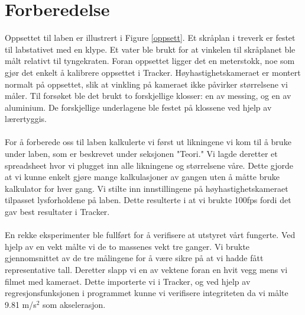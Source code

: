 \documentclass[10pt,a4paper]{report}
\begin{document}
\section*{Forberedelse}
Oppsettet til laben er illustrert i Figure \ref{oppsett}. Et skråplan i treverk er festet til labstativet med en klype. Et vater ble brukt for at vinkelen til skråplanet ble målt relativt til tyngekraten. Foran oppsettet ligger det en meterstokk, noe som gjør det enkelt å kalibrere oppsettet i Tracker. Høyhastighetskameraet er montert normalt på oppsettet, slik at vinkling på kameraet ikke påvirker størrelsene vi måler. Til forsøket ble det brukt to forskjellige klosser: en av messing, og en av aluminium. De forskjellige underlagene ble festet på klossene ved hjelp av lærertyggis.\\
\\For å forberede oss til laben kalkulerte vi først ut likningene vi kom til å bruke under laben, som er beskrevet under seksjonen "Teori." Vi lagde deretter et spreadsheet hvor vi plugget inn alle likningene og størrelsene våre. Dette gjorde at vi kunne enkelt gjøre mange kalkulasjoner av gangen uten å måtte bruke kalkulator for hver gang. Vi stilte inn innstillingene på høyhastighetskameraet tilpasset lysforholdene på laben. Dette resulterte i at vi brukte 100fps fordi det gav best resultater i Tracker.\\
\\En rekke eksperimenter ble fullført for å verifisere at utstyret vårt fungerte. Ved hjelp av en vekt målte vi de to massenes vekt tre ganger. Vi brukte gjennomsnittet av de tre målingene for å være sikre på at vi hadde fått representative tall. Deretter slapp vi en av vektene foran en hvit vegg mens vi filmet med kameraet. Dette importerte vi i Tracker, og ved hjelp av regresjonsfunksjonen i programmet kunne vi verifisere integriteten da vi målte 9.81 m/s$^2$ som akselerasjon.
\end{document}
